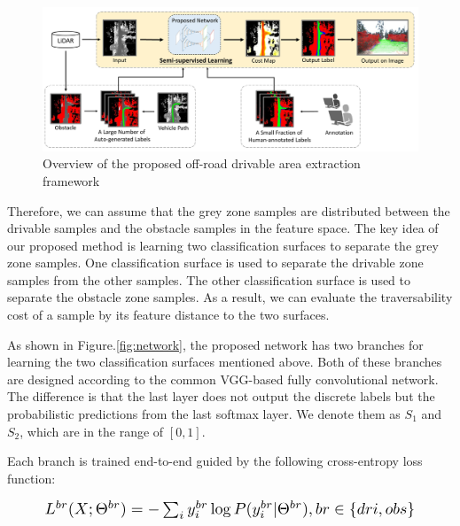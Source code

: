 \documentclass[letterpaper, 10 pt, conference]{ieeeconf}  %
\begin{document}
\begin{figure}[ht]
	\centering
	\includegraphics[scale=0.37]{framework.pdf}
	\caption{Overview of the proposed off-road drivable area extraction framework}
	\label{fig:framework}
	\vspace{-4mm}
\end{figure}

Therefore, we can assume that the grey zone samples are distributed between the drivable samples and the obstacle samples in the feature space. 
The key idea of our proposed method is learning two classification surfaces to separate the grey zone samples. One classification surface is used to separate the drivable zone samples from the other samples. The other classification surface is used to separate the obstacle zone samples. As a result, we can evaluate the traversability cost of a sample by its feature distance to the two surfaces.                                                                                                                                                                                                                                 

As shown in Figure.\ref{fig:network}, the proposed network has two branches for learning the two classification surfaces mentioned above. Both of these branches are designed according to the common VGG-based fully convolutional network. The difference is that the last layer does not output the discrete labels but the probabilistic predictions from the last softmax layer. We denote them as $S_1$ and $S_2$, which are in the range of $[0,1]$.

Each branch is trained end-to-end guided by the following cross-entropy loss function:

\vspace{-4mm}
\begin{equation}
\label{equ:loss0}
\resizebox{.91\hsize}{!}{
	$L^{br}(X;\Theta^{br})=-\sum_{i}{y_i^{br} \log{P(y_i^{br}|\Theta^{br})}}, br \in \{dri, obs\}$
}
\end{equation}
\end{document}
